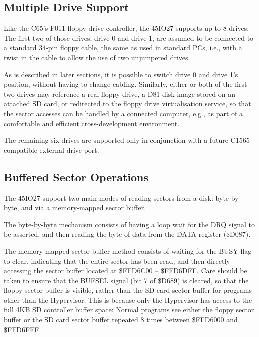 \subsection{Multiple Drive Support}

Like the C65's F011 floppy drive controller, the 45IO27 supports up to 8 drives.
The first two of those drives, drive 0 and drive 1, are assumed to be connected to a
standard 34-pin floppy cable, the same as used in standard PCs, i.e.,
with a twist in the cable to allow the use of two unjumpered drives.

As is described in later sections, it is possible to switch drive 0
and drive 1's position, without having to change cabling. Similarly,
either or both of the first two drives may reference a real floppy
drive, a D81 disk image stored on an attached SD card, or redirected
to the floppy drive virtualisation service, so that the sector
accesses can be handled by a connected computer, e.g., as part of a
comfortable and efficient cross-development environment.

The remaining six drives are supported only in conjunction with a
future C1565-compatible external drive port.

\subsection{Buffered Sector Operations}
\label{subsec:reading-from-disks-and-buffer-management}

The 45IO27 support two main modes of reading sectors from a
disk: byte-by-byte, and via a memory-mapped sector buffer.

The byte-by-byte mechanism consists of having a loop wait for the DRQ
signal to be asserted, and then reading the byte of data from the DATA
register (\$D087).

The memory-mapped sector buffer method consists of waiting for the
BUSY flag to clear, indicating that the entire sector has been read,
and then directly accessing the sector buffer located at \$FFD6C00 --
\$FFD6DFF. Care should be taken to ensure that the BUFSEL signal (bit 7 of \$D689) is
cleared, so that the floppy sector buffer is visible, rather than the
SD card sector buffer for programs other than the Hypervisor. This
is because only the Hypervisor has access to the full 4KB SD
controller buffer space: Normal programs see either the floppy
sector buffer or the SD card sector buffer repeated 8 times between
\$FFD6000 and \$FFD6FFF.

